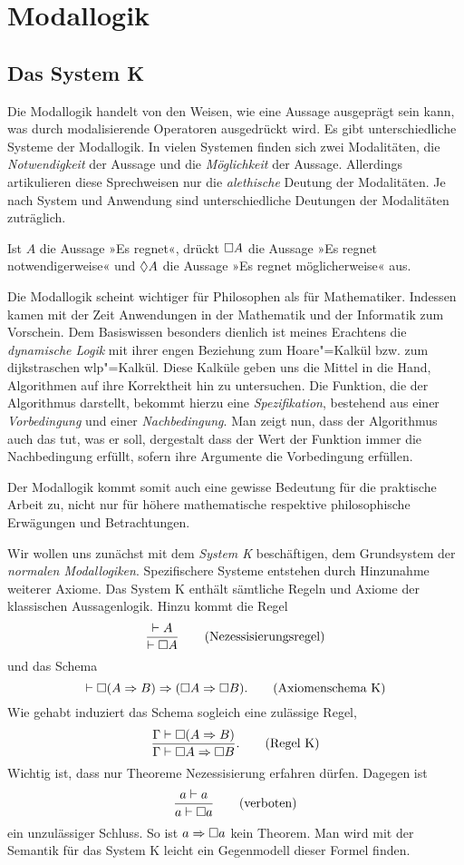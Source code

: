 \newpage
\section{Modallogik}\label{sec:Modallogik}

\subsection{Das System K}

Die Modallogik handelt von den Weisen, wie eine Aussage ausgeprägt sein
kann, was durch modalisierende Operatoren ausgedrückt wird. Es gibt
unterschiedliche Systeme der Modallogik. In vielen Systemen finden sich
zwei Modalitäten, die \emph{Notwendigkeit} der Aussage und die
\emph{Möglichkeit} der Aussage. Allerdings artikulieren diese Sprechweisen
nur die \emph{alethische} Deutung der Modalitäten. Je nach System und
Anwendung sind unterschiedliche Deutungen der Modalitäten zuträglich.

Ist $A$ die Aussage »Es regnet«, drückt $\Box A$ die Aussage
»Es regnet notwendigerweise« und $\Diamond A$ die Aussage
»Es regnet möglicherweise« aus.

Die Modallogik scheint wichtiger für Philosophen als für
Mathematiker. Indessen kamen mit der Zeit Anwendungen in der
Mathematik und der Informatik zum Vorschein. Dem Basiswissen besonders
dienlich ist meines Erachtens die \emph{dynamische Logik} mit
ihrer engen Beziehung zum Hoare"=Kalkül bzw. zum dijkstraschen wlp"=Kalkül.
Diese Kalküle geben uns die Mittel in die Hand, Algorithmen auf ihre Korrektheit
hin zu untersuchen. Die Funktion, die der Algorithmus darstellt, bekommt
hierzu eine \emph{Spezifikation}, bestehend aus einer \emph{Vorbedingung}
und einer \emph{Nachbedingung}. Man zeigt nun, dass der Algorithmus auch
das tut, was er soll, dergestalt dass der Wert der Funktion immer die
Nachbedingung erfüllt, sofern ihre Argumente die Vorbedingung erfüllen.

Der Modallogik kommt somit auch eine gewisse Bedeutung für die praktische
Arbeit zu, nicht nur für höhere mathematische respektive philosophische
Erwägungen und Betrachtungen.

Wir wollen uns zunächst mit dem \emph{System K} beschäftigen, dem
Grundsystem der \emph{normalen Modallogiken}. Spezifischere Systeme
entstehen durch Hinzunahme weiterer Axiome. Das System K enthält
sämtliche Regeln und Axiome der klassischen Aussagenlogik. Hinzu kommt
die Regel
\[\dfrac{\vdash A}{\vdash\Box A}\qquad\text{(Nezessisierungsregel)}\]
und das Schema
\[\vdash\Box(A\Rightarrow B)\Rightarrow (\Box A\Rightarrow\Box B).\qquad\text{(Axiomenschema K)}\]
Wie gehabt induziert das Schema sogleich eine zulässige Regel,
\[\dfrac{\Gamma\vdash\Box(A\Rightarrow B)}{\Gamma\vdash\Box A\Rightarrow\Box B}.\qquad\text{(Regel K)}\]
Wichtig ist, dass nur Theoreme Nezessisierung erfahren dürfen.
Dagegen ist
\[\dfrac{a\vdash a}{a\vdash\Box a}\qquad \text{(verboten)}\]
ein unzulässiger Schluss. So ist $a\Rightarrow\Box a$ kein Theorem. Man wird
mit der Semantik für das System K leicht ein Gegenmodell dieser Formel
finden.

